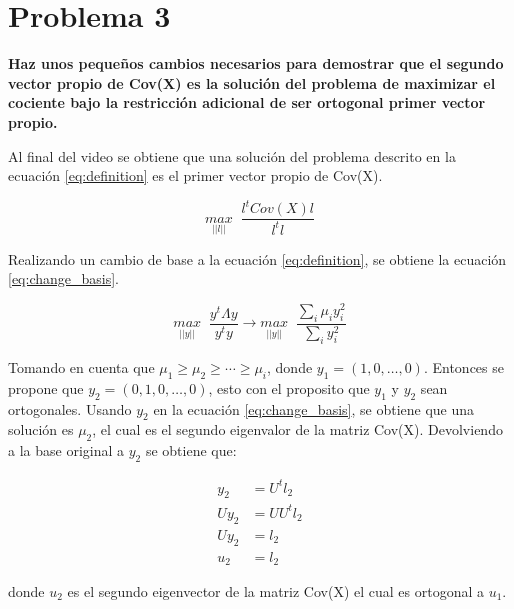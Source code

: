 \section*{Problema 3}

\textbf{Haz unos pequeños cambios necesarios para demostrar que el segundo vector propio de Cov(X) es la solución del problema de maximizar el cociente bajo la restricción adicional de ser ortogonal primer vector propio.}

Al final del video se obtiene que una solución del problema descrito en la ecuación \ref{eq:definition} es el primer vector propio de Cov(X).

\begin{equation}
    \underset{||l||}{max} \;\; \frac{l^t Cov(X) l }{l^t l}
    \label{eq:definition}
\end{equation}

Realizando un cambio de base a la ecuación \ref{eq:definition}, se obtiene la ecuación \ref{eq:change_basis}.

\begin{equation}
    \underset{||y||}{max} \;\; \frac{y^t \Lambda y}{y^ty}  \rightarrow \underset{||y||}{max} \;\; \frac{\sum\limits_i \mu_i y_i^2}{\sum\limits_i y_i^2} \label{eq:change_basis}
\end{equation}

Tomando en cuenta que $\mu_1 \ge \mu_2 \ge \cdots \ge \mu_i$, donde $y_1 = (1,0,\dots,0)$. Entonces se propone que $y_2=(0,1,0,\dots,0)$, esto con el proposito que $y_1$ y $y_2$ sean ortogonales. Usando $y_2$ en la ecuación \ref{eq:change_basis}, se obtiene que una solución es $\mu_2$, el cual es el segundo eigenvalor de la matriz Cov(X). Devolviendo a la base original a $y_2$ se obtiene que:

\begin{align*}
    y_2   & = U^t l_2  \\
    U y_2 & = UU^t l_2 \\
    U y_2 & = l_2      \\
    u_2   & = l_2
\end{align*}

donde $u_2$ es el segundo eigenvector de la matriz Cov(X) el cual es ortogonal a $u_1$.

